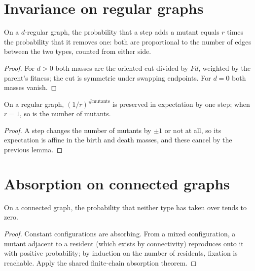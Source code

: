 \section{Invariance on regular graphs}
\begin{lemma}\label{lem:birth-death}
\leanok{}
On a $d$-regular graph, the probability that a step adds a mutant equals $r$ times the
probability that it removes one: both are proportional to the number of edges between the two
types, counted from either side.
\end{lemma}
\begin{proof}\leanok
For $d>0$ both masses are the oriented cut divided by $Fd$, weighted by the parent's fitness;
the cut is symmetric under swapping endpoints. For $d=0$ both masses vanish.
\end{proof}
\begin{theorem}\label{thm:invariance}
\leanok{}
On a regular graph, $(1/r)^{\#\text{mutants}}$ is preserved in expectation by one step; when
$r=1$, so is the number of mutants.
\end{theorem}
\begin{proof}\leanok
A step changes the number of mutants by $\pm1$ or not at all, so its expectation is affine in
the birth and death masses, and these cancel by the previous lemma.
\end{proof}

\section{Absorption on connected graphs}
\begin{theorem}\label{thm:absorption}
\leanok{}
On a connected graph, the probability that neither type has taken over tends to zero.
\end{theorem}
\begin{proof}\leanok
Constant configurations are absorbing. From a mixed configuration, a mutant adjacent to a
resident (which exists by connectivity) reproduces onto it with positive probability; by
induction on the number of residents, fixation is reachable. Apply the shared finite-chain
absorption theorem.
\end{proof}

